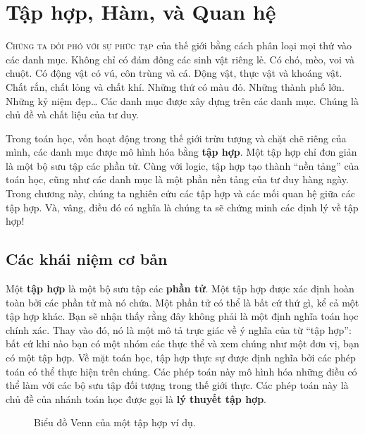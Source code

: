 \chapter{Tập hợp, Hàm, và Quan hệ}

\textsc{Chúng ta đối phó với sự phức tạp} của thế giới bằng cách phân loại mọi thứ vào các danh mục. Không chỉ có đám đông các sinh vật riêng lẻ. Có chó, mèo, voi và chuột. Có động vật có vú, côn trùng và cá. Động vật, thực vật và khoáng vật. Chất rắn, chất lỏng và chất khí. Những thứ có màu đỏ. Những thành phố lớn. Những kỷ niệm đẹp\ldots{} Các danh mục được xây dựng trên các danh mục. Chúng là chủ đề và chất liệu của tư duy.

Trong toán học, vốn hoạt động trong thế giới trừu tượng và chặt chẽ riêng của mình, các danh mục được mô hình hóa bằng \textbf{tập hợp}. Một tập hợp chỉ đơn giản là một bộ sưu tập các phần tử. Cùng với logic, tập hợp tạo thành ``nền tảng'' của toán học, cũng như các danh mục là một phần nền tảng của tư duy hàng ngày. Trong chương này, chúng ta nghiên cứu các tập hợp và các mối quan hệ giữa các tập hợp. Và, vâng, điều đó có nghĩa là chúng ta sẽ chứng minh các định lý về tập hợp!

\section{Các khái niệm cơ bản}

Một \textbf{tập hợp} là một bộ sưu tập các \textbf{phần tử}. Một tập hợp được xác định hoàn toàn bởi các phần tử mà nó chứa. Một phần tử có thể là bất cứ thứ gì, kể cả một tập hợp khác. Bạn sẽ nhận thấy rằng đây không phải là một định nghĩa toán học chính xác. Thay vào đó, nó là một mô tả trực giác về ý nghĩa của từ ``tập hợp'': bất cứ khi nào bạn có một nhóm các thực thể và xem chúng như một đơn vị, bạn có một tập hợp. Về mặt toán học, tập hợp thực sự được định nghĩa bởi các phép toán có thể thực hiện trên chúng. Các phép toán này mô hình hóa những điều có thể làm với các bộ sưu tập đối tượng trong thế giới thực. Các phép toán này là chủ đề của nhánh toán học được gọi là \textbf{lý thuyết tập hợp}.

\begin{figure}[ht]
\centering
{}
\caption{Biểu đồ Venn của một tập hợp ví dụ.}
\label{fig:4.1}
\end{figure}

